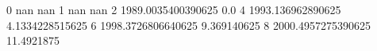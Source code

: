 0 nan nan
1 nan nan
2 1989.0035400390625 0.0
4 1993.136962890625 4.1334228515625
6 1998.3726806640625 9.369140625
8 2000.4957275390625 11.4921875
